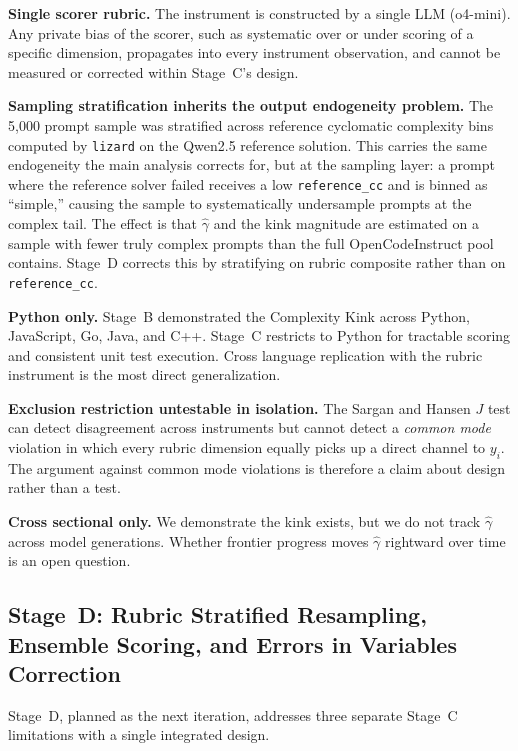 \documentclass[conference]{IEEEtran}
\begin{document}
\textbf{Single scorer rubric.} The instrument is constructed by a single LLM (o4-mini). Any private bias of the scorer, such as systematic over or under scoring of a specific dimension, propagates into every instrument observation, and cannot be measured or corrected within Stage~C's design.

\textbf{Sampling stratification inherits the output endogeneity problem.} The 5{,}000 prompt sample was stratified across reference cyclomatic complexity bins computed by \texttt{lizard} on the Qwen2.5 reference solution. This carries the same endogeneity the main analysis corrects for, but at the sampling layer: a prompt where the reference solver failed receives a low \texttt{reference\_cc} and is binned as ``simple,'' causing the sample to systematically undersample prompts at the complex tail. The effect is that $\hat{\gamma}$ and the kink magnitude are estimated on a sample with fewer truly complex prompts than the full OpenCodeInstruct pool contains. Stage~D corrects this by stratifying on rubric composite rather than on \texttt{reference\_cc}.

\textbf{Python only.} Stage~B demonstrated the Complexity Kink across Python, JavaScript, Go, Java, and C++. Stage~C restricts to Python for tractable scoring and consistent unit test execution. Cross language replication with the rubric instrument is the most direct generalization.

\textbf{Exclusion restriction untestable in isolation.} The Sargan and Hansen $J$ test can detect disagreement across instruments but cannot detect a \emph{common mode} violation in which every rubric dimension equally picks up a direct channel to $y_i$. The argument against common mode violations is therefore a claim about design rather than a test.

\textbf{Cross sectional only.} We demonstrate the kink exists, but we do not track $\hat{\gamma}$ across model generations. Whether frontier progress moves $\hat{\gamma}$ rightward over time is an open question.

\subsection{Stage~D: Rubric Stratified Resampling, Ensemble Scoring, and Errors in Variables Correction}

Stage~D, planned as the next iteration, addresses three separate Stage~C limitations with a single integrated design.
\end{document}
